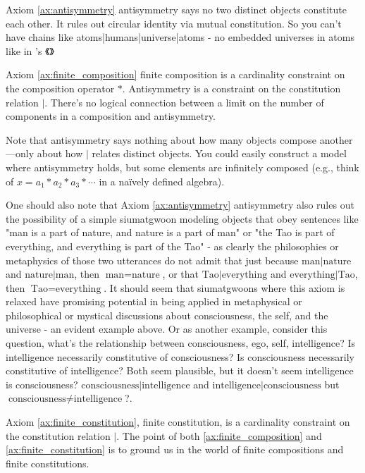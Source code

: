 Axiom \ref{ax:antisymmetry} antisymmetry says no two distinct objects constitute each other. It rules out circular identity via mutual constitution. So you can't have chains like atoms|humans|universe|atoms - no embedded universes in atoms like in 's 《》 

Axiom \ref{ax:finite_composition} finite composition is a cardinality constraint on the composition operator $*$. Antisymmetry is a constraint on the constitution relation $|$. There's no logical connection between a limit on the number of components in a composition and antisymmetry.

Note that antisymmetry says nothing about how many objects compose another—only about how $|$ relates distinct objects. You could easily construct a model where antisymmetry holds, but some elements are infinitely composed (e.g., think of $x = a_1 * a_2 * a_3 * \cdots$ in a naïvely defined algebra).

One should also note that Axiom \ref{ax:antisymmetry} antisymmetry also rules out the possibility of a simple siumatgwoon modeling objects that obey sentences like "man is a part of nature, and nature is a part of man" or "the Tao is part of everything, and everything is part of the Tao" - as clearly the philosophies or metaphysics of those two utterances do not admit that just because $\text{man} | \text{nature}$ and $\text{nature} | \text{man}$, then $\text{man} = \text{nature}$, or that $\text{Tao} | \text{everything}$ and $\text{everything} | \text{Tao}$, then $\text{Tao} = \text{everything}$. It should seem that siumatgwoons where this axiom is relaxed have promising potential in being applied in metaphysical or philosophical or mystical discussions about consciousness, the self, and the universe - an evident example above. Or as another example, consider this question, what's the relationship between consciousness, ego, self, intelligence? Is intelligence necessarily constitutive of consciousness? Is consciousness necessarily constitutive of intelligence? Both seem plausible, but it doesn't seem intelligence is consciousness? $\text{consciousness} | \text{intelligence}$ and $\text{intelligence} | \text{consciousness}$ but $\text{consciousness} \neq \text{intelligence}$?. 


Axiom \ref{ax:finite_constitution}, finite constitution, is a cardinality constraint on the constitution relation $|$. The point of both \ref{ax:finite_composition} and \ref{ax:finite_constitution} is to ground us in the world of finite compositions and finite constitutions. 

